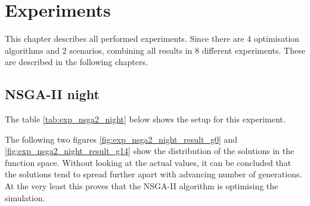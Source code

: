 \documentclass[./\jobname.tex]{subfiles}
\begin{document}
\chapter{Experiments}

This chapter describes all performed experiments. Since there are 4 optimisation algorithms and 2 scenarios, combining all results in 8 different experiments. These are described in the following chapters. 

\section{NSGA-II night}
The table \ref{tab:exp_nsga2_night} below shows the setup for this experiment. 
\begin{table}[H]
	\centering
	\noindent{}
	\label{tab:exp_nsga2_night}
\end{table}

The following two figures \ref{fig:exp_nsga2_night_result_g0} and \ref{fig:exp_nsga2_night_result_g14} show the distribution of the solutions in the function space. Without looking at the actual values, it can be concluded that the solutions tend to spread further apart with advancing number of generations. At the very least this proves that the NSGA-II algorithm is optimising the simulation. 
\end{document}
